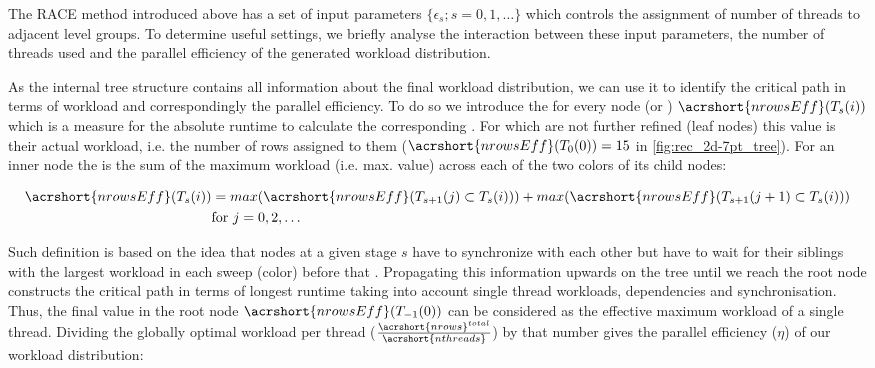 


The \acrshort{RACE} method introduced above has a set of input parameters $\{\epsilon_s; s=0,1,\ldots\}$ which controls the assignment of number of threads to adjacent level groups. 
To determine useful settings, we briefly analyse the interaction between these input parameters, the number of threads used and the parallel efficiency of the generated workload distribution. 

As the internal tree structure contains all information about the final workload distribution, we can use it to identify the critical path in terms of workload and correspondingly the parallel efficiency. To do so we introduce the \effRow for every node (or \levelGroup) $\acrshort{nrowsEff}(T_s(i))$  which is a measure for the absolute runtime to calculate the corresponding \levelGroup. For \levelGroups which are not further refined (leaf nodes) this value is their actual workload, i.e. the number of rows assigned to them ($\acrshort{nrowsEff}(T_0(0)) = 15$ in \cref{fig:rec_2d-7pt_tree}). For an inner node the \effRow  is the sum of the maximum workload (i.e. max. \effRow value) across each of the two colors of its child nodes:

\begin{align*}
\acrshort{nrowsEff}(T_s(i)) &= max(\acrshort{nrowsEff}(T_{s+1}(j) \subset T_s(i))) + max(\acrshort{nrowsEff}(T_{s+1}(j+1) \subset T_s(i)))\\
 & \text{for } j=0,2,\ldots
\end{align*}

Such definition is based on the idea that nodes at a given stage $s$ have to synchronize with each other but have to wait for their siblings with the largest workload in each sweep (color) before that . Propagating this information upwards on the tree until we reach the root node constructs the critical path in terms of longest runtime taking into account single thread workloads, dependencies and synchronisation. Thus, the final value in the root node $\acrshort{nrowsEff}(T_{-1}(0))$ can be considered as the effective maximum workload of a single thread. Dividing the globally optimal workload per thread ($\frac{\acrshort{nrows}^{total}}{\acrshort{nthreads}}$) by that number gives the parallel efficiency ($\eta$) of our workload distribution: 


